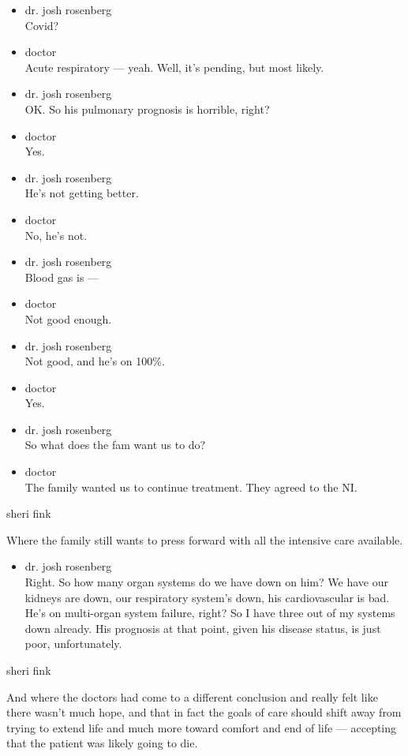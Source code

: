 \begin{itemize}
\item
  dr. josh rosenberg\\
  Covid?
\item
  doctor\\
  Acute respiratory --- yeah. Well, it's pending, but most likely.
\item
  dr. josh rosenberg\\
  OK. So his pulmonary prognosis is horrible, right?
\item
  doctor\\
  Yes.
\item
  dr. josh rosenberg\\
  He's not getting better.
\item
  doctor\\
  No, he's not.
\item
  dr. josh rosenberg\\
  Blood gas is ---
\item
  doctor\\
  Not good enough.
\item
  dr. josh rosenberg\\
  Not good, and he's on 100\%.
\item
  doctor\\
  Yes.
\item
  dr. josh rosenberg\\
  So what does the fam want us to do?
\item
  doctor\\
  The family wanted us to continue treatment. They agreed to the NI.
\end{itemize}

sheri fink

Where the family still wants to press forward with all the intensive
care available.

\begin{itemize}
\tightlist
\item
  dr. josh rosenberg\\
  Right. So how many organ systems do we have down on him? We have our
  kidneys are down, our respiratory system's down, his cardiovascular is
  bad. He's on multi-organ system failure, right? So I have three out of
  my systems down already. His prognosis at that point, given his
  disease status, is just poor, unfortunately.
\end{itemize}

sheri fink

And where the doctors had come to a different conclusion and really felt
like there wasn't much hope, and that in fact the goals of care should
shift away from trying to extend life and much more toward comfort and
end of life --- accepting that the patient was likely going to die.


